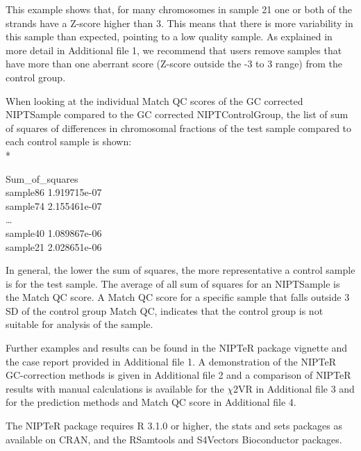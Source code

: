 This example shows that, for many chromosomes in sample 21 one or both of the strands have a Z-score higher than 3. 
This means that there is more variability in this sample than expected, pointing to a low quality sample. 
As explained in more detail in Additional file 1, we recommend that users remove samples that have more than one aberrant score (Z-score outside the -3 to 3 range) from the control group.

When looking at the individual Match QC scores of the GC corrected NIPTSample compared to the GC corrected NIPTControlGroup, the list of sum of squares of differences in chromosomal fractions of the test sample compared to each control sample is shown: \\*


\selectfont %
\footnotesize %
\noindent \hspace{16mm} Sum\_of\_squares \\
sample86 \hspace{1mm} 1.919715e-07 \\
sample74 \hspace{1mm} 2.155461e-07 \\
… \\
sample40 \hspace{1mm} 1.089867e-06 \\
sample21 \hspace{1mm} 2.028651e-06 \\
\selectfont %
\normalsize %


In general, the lower the sum of squares, the more representative a control sample is for the test sample. 
The average of all sum of squares for an NIPTSample is the Match QC score. 
A Match QC score for a specific sample that falls outside 3 SD of the control group Match QC, indicates that the control group is not suitable for analysis of the sample.

Further examples and results can be found in the NIPTeR package vignette \cite{Johansson_2016a} and the case report provided in Additional file 1. 
A demonstration of the NIPTeR GC-correction methods is given in Additional file 2 and a comparison of NIPTeR results with manual calculations is available for the $\chi$2VR in Additional file 3 and for the prediction methods and Match QC score in Additional file 4.

The NIPTeR package requires R 3.1.0 or higher, the stats and sets packages as available on CRAN, and the RSamtools and S4Vectors Bioconductor packages.

